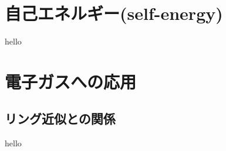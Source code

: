 \documentclass[dvipdfmx,10pt]{beamer}
\begin{document}
\section{自己エネルギー(self-energy)}
\begin{frame}
    hello
\end{frame}

\section{電子ガスへの応用}
\subsection{リング近似との関係}
\begin{frame}
    hello
\end{frame}
\end{document}
